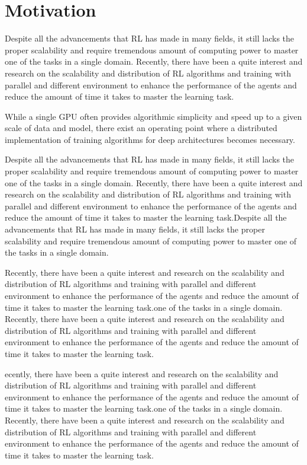 \section{Motivation}
Despite all the advancements that RL has made in many fields, it still lacks the proper scalability and require tremendous amount of computing power to master one of the tasks in a single domain. 
Recently, there have been a quite interest and research on the scalability and distribution of RL algorithms and training with parallel and different environment to enhance the performance of the agents and reduce the amount of time it takes to master the learning task.


While a single GPU often provides algorithmic simplicity and speed up to a given scale of data and
model, there exist an operating point where a distributed implementation of training algorithms for
deep architectures becomes necessary.


Despite all the advancements that RL has made in many fields, it still lacks the proper scalability and require tremendous amount of computing power to master one of the tasks in a single domain. 
Recently, there have been a quite interest and research on the scalability and distribution of RL algorithms and training with parallel and different environment to enhance the performance of the agents and reduce the amount of time it takes to master the learning task.Despite all the advancements that RL has made in many fields, it still lacks the proper scalability and require tremendous amount of computing power to master one of the tasks in a single domain. 


Recently, there have been a quite interest and research on the scalability and distribution of RL algorithms and training with parallel and different environment to enhance the performance of the agents and reduce the amount of time it takes to master the learning task.one of the tasks in a single domain. 
Recently, there have been a quite interest and research on the scalability and distribution of RL algorithms and training with parallel and different environment to enhance the performance of the agents and reduce the amount of time it takes to master the learning task.

ecently, there have been a quite interest and research on the scalability and distribution of RL algorithms and training with parallel and different environment to enhance the performance of the agents and reduce the amount of time it takes to master the learning task.one of the tasks in a single domain. 
Recently, there have been a quite interest and research on the scalability and distribution of RL algorithms and training with parallel and different environment to enhance the performance of the agents and reduce the amount of time it takes to master the learning task.

